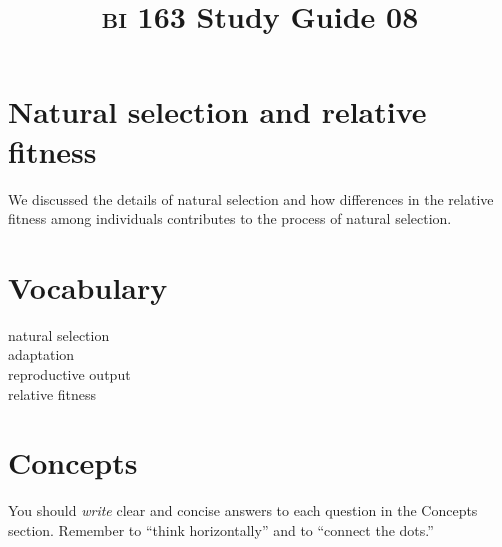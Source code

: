 \documentclass[letterpaper]{tufte-handout}
\title{{\scshape bi} 163 Study Guide 08}
\date{} %
\begin{document}
\maketitle	%

\section*{Natural selection and relative fitness}

We discussed the details of natural selection and how differences in the relative fitness among individuals contributes to the process of natural selection.

\section*{Vocabulary}

\vspace{-1\baselineskip}
\begin{multicols}{2}
natural selection \\
adaptation \\
reproductive output \\
relative fitness \\


\end{multicols}

\section*{Concepts}

You should \emph{write} clear and concise answers to each question in the Concepts section.  Remember to ``think horizontally'' and to ``connect the dots.'' 
\end{document}
